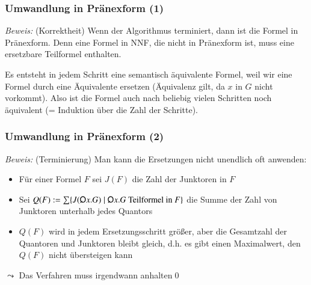 \documentclass[aspectratio=1610,onlymath]{beamer}
\begin{document}
\begin{frame}[t]\frametitle{Umwandlung in Pränexform (1)}

\pause

\emph{Beweis:} (Korrektheit) Wenn der Algorithmus terminiert, dann ist die Formel in Pränexform.
Denn eine Formel in NNF, die nicht in Pränexform ist, muss eine ersetzbare Teilformel enthalten.\bigskip\pause

Es entsteht in jedem Schritt eine semantisch äquivalente Formel, weil
wir eine Formel durch eine Äquivalente ersetzen (Äquivalenz gilt, da $x$ in $G$ nicht vorkommt). Also ist die Formel auch nach beliebig vielen Schritten noch äquivalent (= Induktion über die Zahl der Schritte).

\end{frame}

\begin{frame}[t]\frametitle{Umwandlung in Pränexform (2)}


\emph{Beweis:} (Terminierung) Man kann die Ersetzungen nicht unendlich oft anwenden:\pause
\begin{itemize}
\item Für einer Formel $F$ sei $J(F)$ die Zahl der Junktoren in $F$
\item Sei $Q(F)\defeq \sum\{J(\quantor x.G)\mid \quantor x.G\text{ Teilformel in }F\}$
die Summe der Zahl von Junktoren unterhalb jedes Quantors\pause
\item $Q(F)$ wird in jedem Ersetzungsschritt größer, aber die Gesamtzahl der Quantoren und Junktoren bleibt gleich, d.h. es gibt
einen Maximalwert, den $Q(F)$ nicht übersteigen kann
\end{itemize}
$\leadsto$ Das Verfahren muss irgendwann anhalten\qed

\end{frame}
\end{document}

